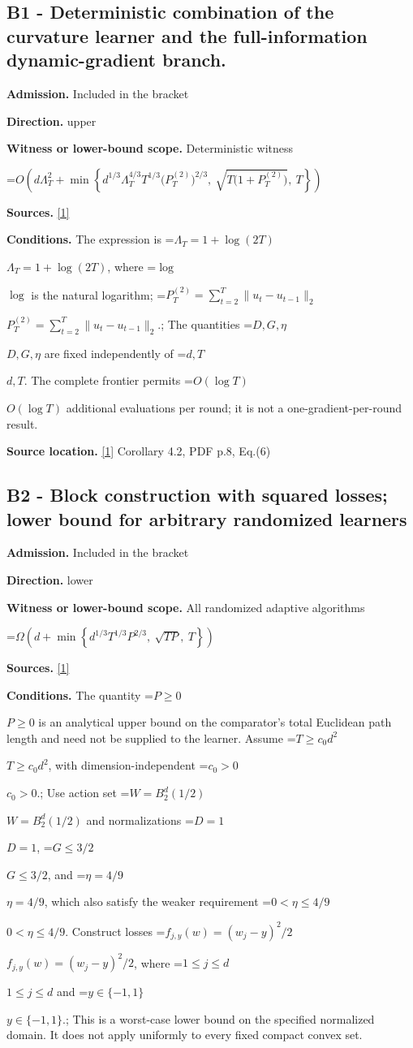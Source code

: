 \documentclass[10pt,a4paper]{article}
\newcommand{\AtlasMath}[1]{\par\begingroup\centering\setbox0=\hbox{$\displaystyle #1$}\ifdim\wd0>1.4\linewidth\typeout{ATLAS WIDE FORMULA: \the\wd0}\fi\ifdim\wd0>\linewidth\resizebox{\linewidth}{!}{\box0}\else\box0\fi\par\endgroup}
\newcommand{\AtlasInlineMath}[1]{\begingroup\setbox0=\hbox{$#1$}\ifdim\wd0>.4\linewidth\endgroup\AtlasMath{#1}\else\endgroup$#1$\fi}
\begin{document}
\subsection{B1 - Deterministic combination of the curvature learner and the full-information dynamic-gradient branch.}
\textbf{Admission.} Included in the bracket

\textbf{Direction.} upper

\textbf{Witness or lower-bound scope.} Deterministic witness

\AtlasMath{O\!\left(d\Lambda_T^2+\min\!\left\{d^{1/3}\Lambda_T^{4/3}T^{1/3}\bigl(P_T^{(2)}\bigr)^{2/3},\ \sqrt{T\bigl(1+P_T^{(2)}\bigr)},\ T\right\}\right)}
\textbf{Sources.} \href{https://arxiv.org/pdf/2610.20187v1}{[1]}

\textbf{Conditions.} The expression is \AtlasInlineMath{\Lambda_T=1+\log(2T)}, where \AtlasInlineMath{\log} is the natural logarithm; \AtlasInlineMath{P_T^{(2)}=\sum_{t=2}^T\|u_t-u_{t-1}\|_2}.; The quantities \AtlasInlineMath{D,G,\eta} are fixed independently of \AtlasInlineMath{d,T}. The complete frontier permits \AtlasInlineMath{O(\log T)} additional evaluations per round; it is not a one-gradient-per-round result.

\textbf{Source location.} \href{https://arxiv.org/pdf/2610.20187v1}{[1]} Corollary 4.2, PDF p.8, Eq.(6)

\subsection{B2 - Block construction with squared losses; lower bound for arbitrary randomized learners}
\textbf{Admission.} Included in the bracket

\textbf{Direction.} lower

\textbf{Witness or lower-bound scope.} All randomized adaptive algorithms

\AtlasMath{\Omega\!\left(d+\min\!\left\{d^{1/3}T^{1/3}P^{2/3},\ \sqrt{TP},\ T\right\}\right)}
\textbf{Sources.} \href{https://arxiv.org/pdf/2610.20187v1}{[1]}

\textbf{Conditions.} The quantity \AtlasInlineMath{P\ge0} is an analytical upper bound on the comparator's total Euclidean path length and need not be supplied to the learner. Assume \AtlasInlineMath{T\ge c_0d^2}, with dimension-independent \AtlasInlineMath{c_0>0}.; Use action set \AtlasInlineMath{W=B_2^d(1/2)} and normalizations \AtlasInlineMath{D=1}, \AtlasInlineMath{G\le3/2}, and \AtlasInlineMath{\eta=4/9}, which also satisfy the weaker requirement \AtlasInlineMath{0<\eta\le4/9}. Construct losses \AtlasInlineMath{f_{j,y}(w)=(w_j-y)^2/2}, where \AtlasInlineMath{1\le j\le d} and \AtlasInlineMath{y\in\{-1,1\}}.; This is a worst-case lower bound on the specified normalized domain. It does not apply uniformly to every fixed compact convex set.
\end{document}
